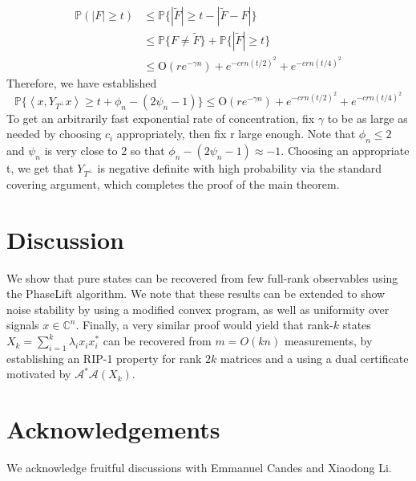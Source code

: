 \documentclass[11pt]{article}
\newcommand{\<}{\langle}
\renewcommand{\>}{\rangle}
\newcommand{\cA}{\mathcal{A}}
\numberwithin{equation}{section}
\newcommand{\Prob}{\mathbb{P}}
\newcommand{\Tp}{T^\perp}
\begin{document}
\begin{align*}
\Prob \left( |F|\geq t \right)  &\leq \Prob\{ |\tilde{F}| \geq t - |\tilde{F}-F|\}\\
&\leq \Prob\{F \neq \tilde{F}\} +  \Prob\{ |\tilde{F}| \geq t \}\\
&\leq  \text{O}(re^{-\gamma n}) + e^{-crn(t/2)^2} + e^{-crn(t/4)^2 }
\end{align*}
Therefore, we have established
\[
\mathbb{P}\{ \left<x,Y_{\Tp}x \right> \geq t + \phi_n - (2\psi_n-1) \} \leq \text{O}(re^{-\gamma n}) + e^{-crn(t/2)^2} + e^{-crn(t/4)^2 }
\]
To get an arbitrarily fast exponential rate of concentration, fix $\gamma$ to be as large as needed by choosing $c_i$ appropriately, then fix r large enough. Note that $\phi_n \leq 2$ and $\psi_n$ is very close to 2 so that $\phi_n - (2\psi_n-1) \approx -1$. Choosing an appropriate t, we get that $Y_{\Tp}$ is negative definite with high probability via the standard covering argument, which completes the proof of the main theorem. 

\section{Discussion}
We show that pure states can be recovered from few full-rank observables using the PhaseLift algorithm. We note that these results can be extended to show noise stability by using a modified convex program, as well as uniformity over signals $x \in \mathbb{C}^n$. Finally, a very similar proof would yield that rank-$k$ states $X_k = \sum_{i=1}^k \lambda_i x_i x_i^*$ can be recovered from $m = O(kn)$ measurements, by establishing an RIP-1 property for rank $2k$ matrices and a using a dual certificate motivated by $\cA^* \cA(X_k)$.

\section{Acknowledgements}
We acknowledge fruitful discussions with Emmanuel Candes and Xiaodong Li. 



\end{document}
